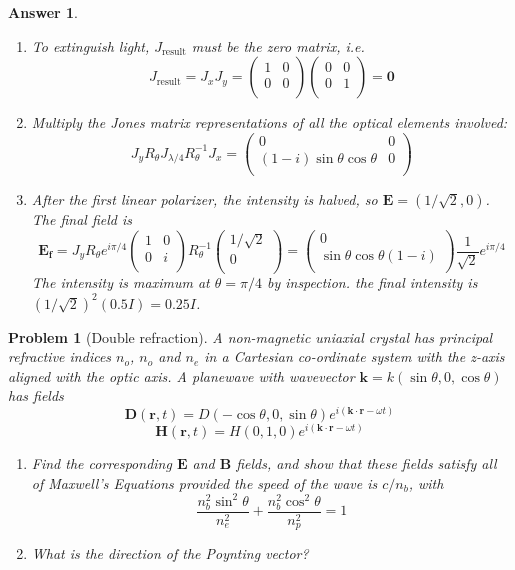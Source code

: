 \documentclass[a4paper]{article}
\newtheorem{ans}{Answer}
\theoremstyle{new}
\newtheorem{qns}{Problem}
\begin{document}
\begin{ans}\leavevmode
\begin{enumerate}[label=(\alph*)]
\item To extinguish light, $J_{\text{result}}$ must be the zero matrix, i.e.
$$J_{\text{result}}=J_xJ_y=\begin{pmatrix}1&0\\0&0\\\end{pmatrix}\begin{pmatrix}0&0\\0&1\\\end{pmatrix}=\boldsymbol{0}$$
\item Multiply the Jones matrix representations of all the optical elements involved:
$$J_yR_\theta J_{\lambda/4}R_\theta^{-1}J_x=\begin{pmatrix}0&0\\(1-i)\sin\theta\cos\theta&0\\\end{pmatrix}$$
\item After the first linear polarizer, the intensity is halved, so $\mathbf{E}=(1/\sqrt{2},0)$. The final field is
$$\mathbf{E_f}=J_yR_\theta e^{i\pi/4}\begin{pmatrix}1&0\\0&i\\\end{pmatrix}R_\theta^{-1}\begin{pmatrix}1/\sqrt{2}\\0\\\end{pmatrix}=\begin{pmatrix}0\\\sin\theta\cos\theta(1-i)\\\end{pmatrix}\frac{1}{\sqrt{2}}e^{i\pi/4}$$
The intensity is maximum at $\theta=\pi/4$ by inspection. the final intensity is $(1/\sqrt{2})^2(0.5I)=0.25 I$.
\end{enumerate}
\end{ans}
\begin{qns}[Double refraction]
A non-magnetic uniaxial crystal has principal refractive indices $n_o$, $n_o$ and $n_e$ in a Cartesian co-ordinate system with the z-axis aligned with the optic axis. A planewave with wavevector $\mathbf{k} = k(\sin\theta, 0, \cos \theta)$ has fields
$$\mathbf{D}(\mathbf{r},t)=D(-\cos\theta,0,\sin\theta)e^{i(\mathbf{k}\cdot\mathbf{r}-\omega t)}$$
$$\mathbf{H}(\mathbf{r},t)=H(0,1,0)e^{i(\mathbf{k}\cdot\mathbf{r}-\omega t)}$$
\begin{enumerate}[label=(\alph*)]
\item Find the corresponding $\mathbf{E}$ and $\mathbf{B}$ fields, and show that these fields satisfy all of Maxwell’s Equations provided the speed of the wave is $c/n_b$, with
$$\frac{n_b^2\sin^2\theta}{n_e^2}+\frac{n_b^2\cos^2\theta}{n_p^2}=1$$
\item What is the direction of the Poynting vector?
\end{enumerate}
\end{qns}
\end{document}
